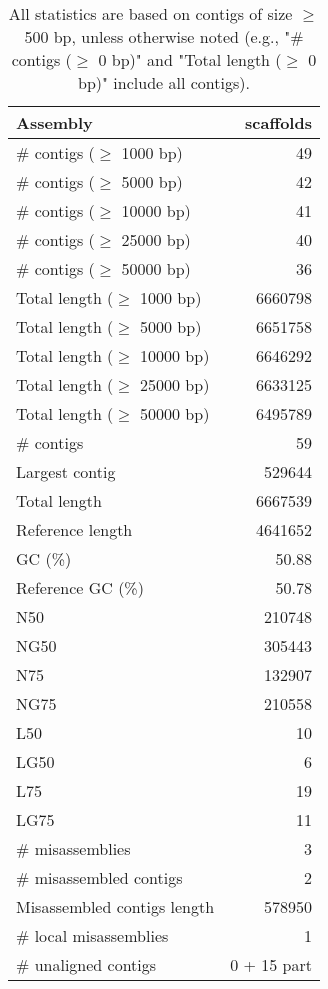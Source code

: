 \documentclass[12pt,a4paper]{article}
\begin{document}
\begin{table}[ht]
\begin{center}
\caption{All statistics are based on contigs of size $\geq$ 500 bp, unless otherwise noted (e.g., "\# contigs ($\geq$ 0 bp)" and "Total length ($\geq$ 0 bp)" include all contigs).}
\begin{tabular}{|l*{1}{|r}|}
\hline
Assembly & scaffolds \\ \hline
\# contigs ($\geq$ 1000 bp) & 49 \\ \hline
\# contigs ($\geq$ 5000 bp) & 42 \\ \hline
\# contigs ($\geq$ 10000 bp) & 41 \\ \hline
\# contigs ($\geq$ 25000 bp) & 40 \\ \hline
\# contigs ($\geq$ 50000 bp) & 36 \\ \hline
Total length ($\geq$ 1000 bp) & 6660798 \\ \hline
Total length ($\geq$ 5000 bp) & 6651758 \\ \hline
Total length ($\geq$ 10000 bp) & 6646292 \\ \hline
Total length ($\geq$ 25000 bp) & 6633125 \\ \hline
Total length ($\geq$ 50000 bp) & 6495789 \\ \hline
\# contigs & 59 \\ \hline
Largest contig & 529644 \\ \hline
Total length & 6667539 \\ \hline
Reference length & 4641652 \\ \hline
GC (\%) & 50.88 \\ \hline
Reference GC (\%) & 50.78 \\ \hline
N50 & 210748 \\ \hline
NG50 & 305443 \\ \hline
N75 & 132907 \\ \hline
NG75 & 210558 \\ \hline
L50 & 10 \\ \hline
LG50 & 6 \\ \hline
L75 & 19 \\ \hline
LG75 & 11 \\ \hline
\# misassemblies & 3 \\ \hline
\# misassembled contigs & 2 \\ \hline
Misassembled contigs length & 578950 \\ \hline
\# local misassemblies & 1 \\ \hline
\# unaligned contigs & 0 + 15 part \\ \hline

\end{tabular}
\end{center}
\end{table}
\end{document}
